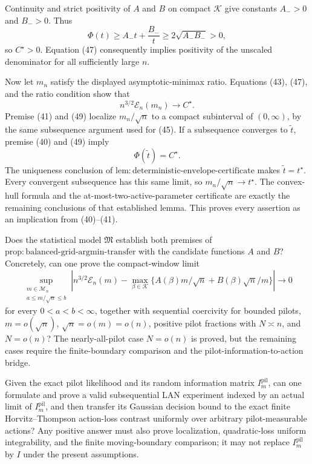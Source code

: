 Continuity and strict positivity of \(A\) and \(B\) on compact
\(\mathcal K\) give constants \(A_->0\) and \(B_->0\).  Thus
\[
\Phi(t)\geq A_-t+\frac{B_-}{t}
\geq2\sqrt{A_-B_-}>0,
\tag{48}
\]
so \(C^\star>0\).  Equation (47) consequently implies positivity of the unscaled denominator for all sufficiently large \(n\).

Now let \(m_n\) satisfy the displayed asymptotic-minimax ratio.  Equations (43), (47), and the ratio condition show that
\[
n^{3/2}\mathcal E_n(m_n)\longrightarrow C^\star.
\tag{49}
\]
Premise (41) and (49) localize \(m_n/\sqrt n\) to a compact subinterval of \((0,\infty)\), by the same subsequence argument used for (45).  If a subsequence converges to \(\widetilde t\), premise (40) and (49) imply
\[
\Phi(\widetilde t)=C^\star.
\tag{50}
\]
The uniqueness conclusion of
\(\mathrm{lem{:}deterministic\text{-}envelope\text{-}certificate}\)
makes \(\widetilde t=t^\star\).  Every convergent subsequence has this same limit, so \(m_n/\sqrt n\to t^\star\).  The convex-hull formula and the at-most-two-active-parameter certificate are exactly the remaining conclusions of that established lemma.  This proves every assertion as an implication from (40)--(41).

Does the statistical model \(\mathfrak M\) establish both premises of \(\mathrm{prop{:}balanced\text{-}grid\text{-}argmin\text{-}transfer}\) with the candidate functions \(A\) and \(B\)?  Concretely, can one prove the compact-window limit
\[
\sup_{\substack{m\in\mathcal M_n\\ a\leq m/\sqrt n\leq b}}
\left|n^{3/2}\mathcal E_n(m)
-\max_{\beta\in\mathcal K}
\{A(\beta)m/\sqrt n+B(\beta)\sqrt n/m\}\right|
\longrightarrow0
\]
for every \(0<a<b<\infty\), together with sequential coercivity for bounded pilots, \(m=o(\sqrt n)\), \(\sqrt n=o(m)=o(n)\), positive pilot fractions with \(N\asymp n\), and \(N=o(n)\)?  The nearly-all-pilot case \(N=o(n)\) is proved, but the remaining cases require the finite-boundary comparison and the pilot-information-to-action bridge.

Given the exact pilot likelihood and its random information matrix \(I_m^{\mathrm{pil}}\), can one formulate and prove a valid subsequential LAN experiment indexed by an actual limit of \(I_m^{\mathrm{pil}}\), and then transfer its Gaussian decision bound to the exact finite Horvitz--Thompson action-loss contrast uniformly over arbitrary pilot-measurable actions?  Any positive answer must also prove localization, quadratic-loss uniform integrability, and the finite moving-boundary comparison; it may not replace \(I_m^{\mathrm{pil}}\) by \(I\) under the present assumptions.

